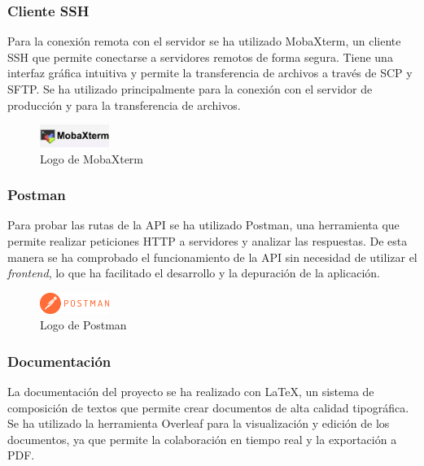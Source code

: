 \subsubsection{Cliente SSH}
Para la conexión remota con el servidor se ha utilizado MobaXterm, un cliente SSH que permite conectarse a servidores remotos de forma segura.
Tiene una interfaz gráfica intuitiva y permite la transferencia de archivos a través de SCP y SFTP.
Se ha utilizado principalmente para la conexión con el servidor de producción y para la transferencia de archivos.

\begin{figure}[H]
    \centering
    \includegraphics[width=0.2\textwidth]{figures/7-Construccion/MobaXterm.png}
    \caption{Logo de MobaXterm}
\end{figure}

\subsubsection{Postman}
Para probar las rutas de la API se ha utilizado Postman, una herramienta que permite realizar peticiones HTTP a servidores y analizar las respuestas.
De esta manera se ha comprobado el funcionamiento de la API sin necesidad de utilizar el \textit{frontend}, lo que ha facilitado el desarrollo y la depuración de la aplicación.

\begin{figure}[H]
    \centering
    \includegraphics[width=0.2\textwidth]{figures/7-Construccion/Postman.png}
    \caption{Logo de Postman}
\end{figure}


\subsubsection{Documentación}

La documentación del proyecto se ha realizado con LaTeX, un sistema de composición de textos que permite crear documentos de alta calidad tipográfica.
Se ha utilizado la herramienta Overleaf para la visualización y edición de los documentos, ya que permite la colaboración en tiempo real y la exportación a PDF.


